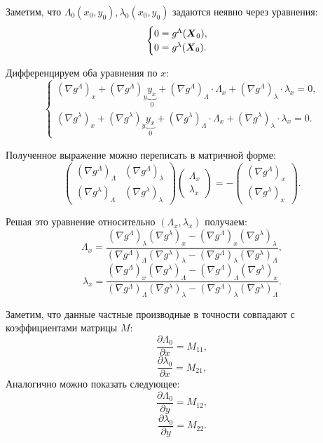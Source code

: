 \begin{enumerate}
Заметим, что $\Lambda_0(x_0,y_0), \lambda_0(x_0,y_0)$ задаются неявно через уравнения:
\begin{equation}
    \begin{cases}
        0=g^\Lambda(\boldsymbol{X}_0), \\
        0=g^\lambda(\boldsymbol{X}_0). \\
    \end{cases}
\end{equation}

Дифференцируем оба уравнения по \(x\):
\[
\begin{cases}
(\nabla g^\Lambda)_x + (\nabla g^\Lambda)_y \underbrace{y_x}_0 + (\nabla g^\Lambda)_\Lambda \cdot \Lambda_x + (\nabla g^\Lambda)_\lambda \cdot \lambda_x = 0, \\
(\nabla g^\lambda)_x + (\nabla g^\lambda)_y \underbrace{y_x}_0 + (\nabla g^\lambda)_\Lambda \cdot \Lambda_x + (\nabla g^\lambda)_\lambda \cdot \lambda_x = 0.
\end{cases}
\]

Полученное выражение можно переписать в матричной форме:
\[
\begin{pmatrix}
(\nabla g^\Lambda)_\Lambda & (\nabla g^\Lambda)_\lambda \\
(\nabla g^\lambda)_\Lambda & (\nabla g^\lambda)_\lambda
\end{pmatrix}
\begin{pmatrix}
\Lambda_x \\
\lambda_x
\end{pmatrix}
= -
\begin{pmatrix}
(\nabla g^\Lambda)_x \\
(\nabla g^\lambda)_x
\end{pmatrix}.
\]

Решая это уравнение относительно $(\Lambda_x,\lambda_x)$ получаем:
$$
\Lambda_x = \frac{(\nabla g^\Lambda)_\lambda (\nabla g^\lambda)_x - (\nabla g^\Lambda)_x (\nabla g^\lambda)_\lambda}{(\nabla g^\Lambda)_\Lambda (\nabla g^\lambda)_\lambda - (\nabla g^\Lambda)_\lambda (\nabla g^\lambda)_\Lambda},
$$
$$
\lambda_x = \frac{(\nabla g^\Lambda)_x (\nabla g^\lambda)_\Lambda - (\nabla g^\Lambda)_\Lambda (\nabla g^\lambda)_x}{(\nabla g^\Lambda)_\Lambda (\nabla g^\lambda)_\lambda - (\nabla g^\Lambda)_\lambda (\nabla g^\lambda)_\Lambda}.
$$

Заметим, что данные частные производные в точности совпадают с коэффициентами матрицы $M$:
$$
\frac{\partial \Lambda_0}{\partial x} = M_{11},
$$
$$
\frac{\partial \lambda_0}{\partial x} = M_{21},
$$
Аналогично можно показать следующее:
$$
\frac{\partial \Lambda_0}{\partial y} = M_{12},
$$
$$
\frac{\partial \lambda_0}{\partial y} = M_{22}.
$$


\end{enumerate}
